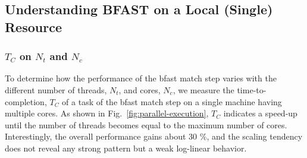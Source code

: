 \documentclass{acm_proc_article-sp}
\begin{document}
% 


\subsection{Understanding BFAST on a Local (Single) Resource}

\subsubsection{$T_{C}$ on $N_t$ and $N_c$}

To determine how the performance of the bfast match step varies with
the different number of threads, $N_t$, and cores, $N_c$, we measure
the time-to-completion, $T_C$ of a task of the bfast match step on a
single machine having multiple cores.  As shown in
Fig.~\ref{fig:parallel-execution}, $T_{C}$ indicates a speed-up until
the number of threads becomes equal to the maximum number of cores.
Interestingly, the overall performance gains about 30 \%, and the
scaling tendency does not reveal any strong pattern but a weak
log-linear behavior.


%
%
\end{document}
